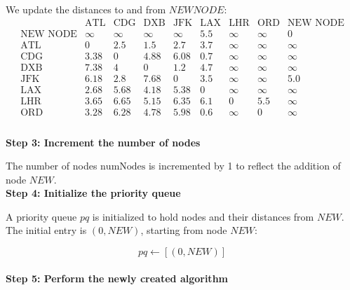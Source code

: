 \documentclass[conference]{IEEEtran}
\begin{document}
We update the distances to and from \( NEW NODE \):
\[
\begin{array}{c|ccccccc|c}
     & \text{ATL} & \text{CDG} & \text{DXB} & \text{JFK} & \text{LAX} & \text{LHR} & \text{ORD} & \text{NEW NODE} \\
\hline
\text{NEW NODE} & \infty & \infty & \infty & \infty & 5.5 & \infty & \infty & 0 \\
\hline
\text{ATL} & 0 & 2.5 & 1.5 & 2.7 & 3.7 & \infty & \infty  & \infty\\
\text{CDG} & 3.38 & 0 & 4.88 & 6.08 & 0.7 & \infty & \infty & \infty \\
\text{DXB} & 7.38 & 4 & 0 & 1.2 & 4.7 & \infty  & \infty & \infty \\
\text{JFK} & 6.18 & 2.8 & 7.68 & 0 & 3.5 & \infty & \infty & 5.0 \\
\text{LAX} & 2.68 & 5.68 & 4.18 & 5.38 & 0 & \infty & \infty & \infty \\
\text{LHR} & 3.65 & 6.65 & 5.15 & 6.35 & 6.1 & 0 & 5.5 & \infty \\
\text{ORD} & 3.28 & 6.28 & 4.78 & 5.98 & 0.6 & \infty & 0 & \infty\\
\end{array}
\]
\\
\textbf{Step 3: Increment the number of nodes}

The number of nodes \( \text{numNodes} \) is incremented by 1 to reflect the addition of node \( NEW \).
\\


\textbf{Step 4: Initialize the priority queue}

A priority queue \( pq \) is initialized to hold nodes and their distances from \( NEW \). The initial entry is \( (0, NEW) \), starting from node \( NEW \):

\[
pq \gets [(0, NEW)]
\]
\\
\textbf{Step 5: Perform the newly created algorithm}
\end{document}
